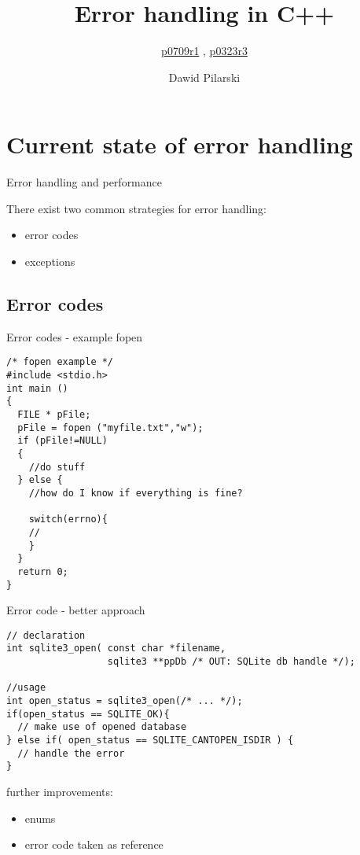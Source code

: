 \documentclass[10pt,a4paper]{beamer}
\date{}
\author{Dawid Pilarski}
\title{Error handling in C++}
\subtitle{\href{http://www.open-std.org/jtc1/sc22/wg21/docs/papers/2018/p0709r1.pdf}{p0709r1} , \href{http://www.open-std.org/jtc1/sc22/wg21/docs/papers/2017/p0323r3.pdf}{p0323r3}}
\begin{document}
\begin{frame}
	\titlepage
\end{frame}

\begin{frame}
	\tableofcontents
\end{frame}

\section{Current state of error handling}
\begin{frame}{Error handling and performance}
	
	There exist two common strategies for error handling:
	\begin{itemize}
		\item error codes
		\item exceptions
	\end{itemize}

\end{frame}

\subsection{Error codes}
\begin{frame}[fragile]{Error codes - example fopen}
	\begin{verbatim}
/* fopen example */
#include <stdio.h>
int main ()
{
  FILE * pFile;
  pFile = fopen ("myfile.txt","w");
  if (pFile!=NULL)
  {
    //do stuff
  } else {
    //how do I know if everything is fine?
    
    switch(errno){
    // 
    }
  }
  return 0;
}
	\end{verbatim}
\end{frame}


\begin{frame}[fragile]{Error code - better approach}
	\begin{verbatim}
// declaration
int sqlite3_open( const char *filename,
                  sqlite3 **ppDb /* OUT: SQLite db handle */);
	
//usage
int open_status = sqlite3_open(/* ... */);
if(open_status == SQLITE_OK){
  // make use of opened database
} else if( open_status == SQLITE_CANTOPEN_ISDIR ) {
  // handle the error
}
	\end{verbatim}


	\begin{block}{further improvements:}
		\begin{itemize}
			\item enums
			\item error code taken as reference
		\end{itemize}	
	\end{block}
\end{frame}
\end{document}
